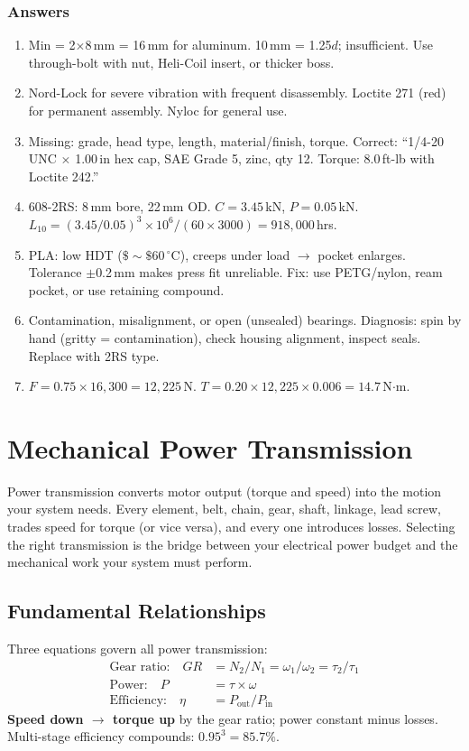 \documentclass[11pt,letterpaper,twoside,openany]{book}
\newcommand{\degC}{\ensuremath{{}^{\circ}\text{C}}}
\begin{document}
\subsection{Answers}
\begin{enumerate}[leftmargin=1.5em]
\item Min = 2$\times$8\,mm = 16\,mm for aluminum. 10\,mm = 1.25$d$; insufficient. Use through-bolt with nut, Heli-Coil insert, or thicker boss.
\item Nord-Lock for severe vibration with frequent disassembly. Loctite 271 (red) for permanent assembly. Nyloc for general use.
\item Missing: grade, head type, length, material/finish, torque. Correct: ``1/4-20 UNC $\times$ 1.00\,in hex cap, SAE Grade 5, zinc, qty 12. Torque: 8.0\,ft-lb with Loctite 242.''
\item 608-2RS: 8\,mm bore, 22\,mm OD. $C = 3.45$\,kN, $P = 0.05$\,kN. $L_{10} = (3.45/0.05)^3 \times 10^6/(60 \times 3000) = 918{,}000$\,hrs.
\item PLA: low HDT ($\$\sim\$$60\,\degC{}), creeps under load $\to$ pocket enlarges. Tolerance $\pm$0.2\,mm makes press fit unreliable. Fix: use PETG/nylon, ream pocket, or use retaining compound.
\item Contamination, misalignment, or open (unsealed) bearings. Diagnosis: spin by hand (gritty = contamination), check housing alignment, inspect seals. Replace with 2RS type.
\item $F = 0.75 \times 16{,}300 = 12{,}225$\,N. $T = 0.20 \times 12{,}225 \times 0.006 = 14.7$\,N$\cdot$m.
\end{enumerate}


\chapter{Mechanical Power Transmission}

\vspace{1em}

Power transmission converts motor output (torque and speed) into the motion your system needs. Every element, belt, chain, gear, shaft, linkage, lead screw, trades speed for torque (or vice versa), and every one introduces losses. Selecting the right transmission is the bridge between your electrical power budget and the mechanical work your system must perform.

\vspace{1em}

\section{Fundamental Relationships}
Three equations govern all power transmission:
\begin{align}
\text{Gear ratio:} \quad GR &= N_2/N_1 = \omega_1/\omega_2 = \tau_2/\tau_1 \\
\text{Power:} \quad P &= \tau \times \omega \\
\text{Efficiency:} \quad \eta &= P_{\text{out}}/P_{\text{in}}
\end{align}
\textbf{Speed down $\to$ torque up} by the gear ratio; power constant minus losses. Multi-stage efficiency compounds: $0.95^3 = 85.7\%$.
\end{document}
